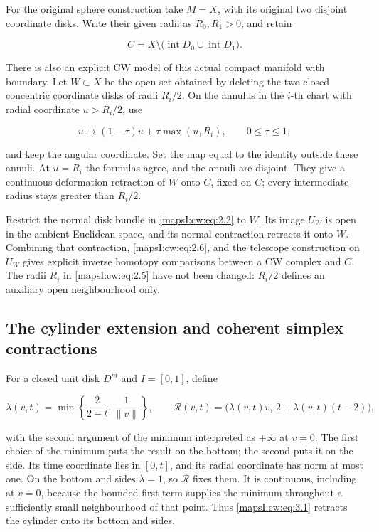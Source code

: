 For the original sphere construction take \(M=X\), with its original two disjoint coordinate disks. Write their given radii as \(R_0,R_1>0\), and retain

\begin{equation}
C=X\setminus\bigl(\operatorname{int}D_0\cup\operatorname{int}D_1\bigr).
\label{mapsI:cw:eq:2.5}
\end{equation}

There is also an explicit CW model of this actual compact manifold with boundary. Let \(W\subset X\) be the open set obtained by deleting the two closed concentric coordinate disks of radii \(R_i/2\). On the annulus in the \(i\)-th chart with radial coordinate \(u>R_i/2\), use

\begin{equation}
u\longmapsto(1-\tau)u+\tau\max(u,R_i),\qquad 0\leq\tau\leq1,
\label{mapsI:cw:eq:2.6}
\end{equation}

and keep the angular coordinate. Set the map equal to the identity outside these annuli. At \(u=R_i\) the formulas agree, and the annuli are disjoint. They give a continuous deformation retraction of \(W\) onto \(C\), fixed on \(C\); every intermediate radius stays greater than \(R_i/2\).

Restrict the normal disk bundle in \eqref{mapsI:cw:eq:2.2} to \(W\). Its image \(U_W\) is open in the ambient Euclidean space, and its normal contraction retracts it onto \(W\). Combining that contraction, \eqref{mapsI:cw:eq:2.6}, and the telescope construction on \(U_W\) gives explicit inverse homotopy comparisons between a CW complex and \(C\). The radii \(R_i\) in \eqref{mapsI:cw:eq:2.5} have not been changed: \(R_i/2\) defines an auxiliary open neighbourhood only.

\subsection{The cylinder extension and coherent simplex contractions}
\label{mapsI:cw:hurewicz-coherent}

For a closed unit disk \(D^m\) and \(I=[0,1]\), define

\begin{equation}
\lambda(v,t)=\min\left\{\frac{2}{2-t},\frac1{\lVert v\rVert}\right\},
\qquad
\mathcal R(v,t)=\bigl(\lambda(v,t)v,\,2+\lambda(v,t)(t-2)\bigr),
\label{mapsI:cw:eq:3.1}
\end{equation}

with the second argument of the minimum interpreted as \(+\infty\) at \(v=0\). The first choice of the minimum puts the result on the bottom; the second puts it on the side. Its time coordinate lies in \([0,t]\), and its radial coordinate has norm at most one. On the bottom and sides \(\lambda=1\), so \(\mathcal R\) fixes them. It is continuous, including at \(v=0\), because the bounded first term supplies the minimum throughout a sufficiently small neighbourhood of that point. Thus \eqref{mapsI:cw:eq:3.1} retracts the cylinder onto its bottom and sides.

